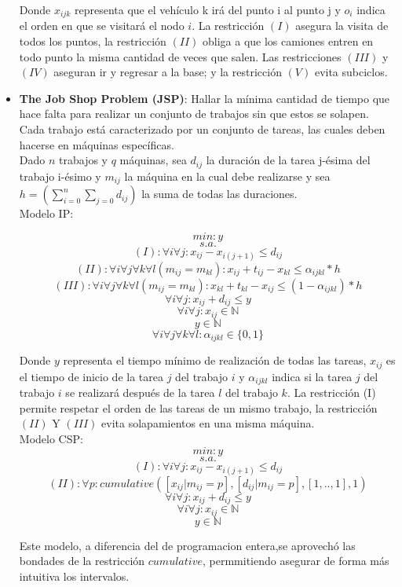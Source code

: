 \documentclass[12pt]{report}
\begin{document}
\begin{itemize}
Donde $x_{ijk}$ representa que el vehículo k irá del punto i al punto j y $o_i$ indica el orden en que se visitará el nodo $i$. La restricción $(I)$ asegura la visita de todos los puntos, la restricción $(II)$ obliga a que los camiones entren en todo punto la misma cantidad de veces que salen. Las restricciones $(III)$ y $(IV)$ aseguran ir y regresar a la base; y la restricción $(V)$ evita subciclos.


\item \textbf{The Job Shop Problem (JSP)}: Hallar la mínima cantidad de tiempo que hace falta para realizar un conjunto de trabajos sin que estos se solapen. Cada trabajo está caracterizado por un conjunto de tareas, las cuales deben hacerse en máquinas específicas.\\

Dado $n$ trabajos y $q$ máquinas, sea $d_{ij}$ la duración de la tarea j-ésima del trabajo i-ésimo y $m_{ij}$ la máquina en la cual debe realizarse y sea $h=(\sum_{i=0}^n\sum_{j=0}d_{ij})$ la suma de todas las duraciones.\\

Modelo IP:

$$min: y$$
$$s.a.$$
$$(I):\forall i \forall j: x_{ij}-x_{i(j+1)} \leq d_{ij}$$
$$(II):\forall i \forall j \forall k \forall l(m_{ij}=m_{kl}): x_{ij}+t_{ij}-x_{kl} \leq \alpha_{ijkl}*h$$
$$(III):\forall i \forall j \forall k \forall l(m_{ij}=m_{kl}): x_{kl}+t_{kl}-x_{ij} \leq (1-\alpha_{ijkl})*h$$
$$\forall i\forall j:x_{ij}+d_{ij}\leq y$$
$$\forall i\forall j: x_{ij}\in\mathbb{N}$$
$$y\in\mathbb{N}$$
$$\forall i\forall j\forall k\forall l:\alpha_{ijkl}\in\{0,1\}$$

Donde $y$ representa el tiempo mínimo de realización de todas las tareas, $x_{ij}$ es el tiempo de inicio de la tarea $j$ del trabajo $i$ y $\alpha_{ijkl}$ indica si la tarea $j$ del trabajo $i$ se realizará después de la tarea $l$ del trabajo $k$. La restricción (I) permite respetar el orden de las tareas de un mismo trabajo, la restricción $(II)$ Y $(III)$ evita solapamientos en una misma máquina.\\

Modelo CSP:
$$min: y$$
$$s.a.$$
$$(I):\forall i \forall j: x_{ij}-x_{i(j+1)} \leq d_{ij}$$
$$(II): \forall p: cumulative([x_{ij}|m_{ij}=p],[d_{ij}|m_{ij}=p],[1,..,1],1)$$
$$\forall i\forall j:x_{ij}+d_{ij}\leq y$$
$$\forall i\forall j: x_{ij}\in\mathbb{N}$$
$$y\in\mathbb{N}$$

Este modelo, a diferencia del de programacion entera,se aprovechó las bondades de la restricción $cumulative$, permmitiendo asegurar de forma más intuitiva los intervalos.


\end{itemize}
\end{document}
